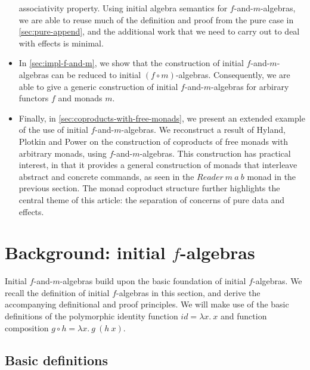 \documentclass{jfp1}
\begin{document}
\begin{itemize}
  associativity property. Using initial algebra semantics for
  $f$-and-$m$-algebras, we are able to reuse much of the
  definition and proof from the pure case in
  \autoref{sec:pure-append}, and the additional work that we need to
  carry out to deal with effects is minimal.
\item In \autoref{sec:impl-f-and-m}, we show that the construction of
  initial $f$-and-$m$-algebras can be reduced to initial $(f \circ
  m)$-algebras. Consequently, we are able to give a generic
  construction of initial $f$-and-$m$-algebras for arbirary functors
  $f$ and monads $m$.
\item Finally, in \autoref{sec:coproducts-with-free-monads}, we
  present an extended example of the use of initial
  $f$-and-$m$-algebras. We reconstruct a result of Hyland, Plotkin and
  Power on the construction of coproducts of free monads with
  arbitrary monads, using $f$-and-$m$-algebras. This construction has
  practical interest, in that it provides a general construction of
  monads that interleave abstract and concrete commands, as seen in
  the $\mathit{Reader}~m~a~b$ monad in the previous section. The monad
  coproduct structure further highlights the central theme of this
  article: the separation of concerns of pure data and effects.
\end{itemize}

\section{Background: initial \texorpdfstring{$f$}{f}-algebras}
\label{sec:f-algebras}

Initial $f$-and-$m$-algebras build upon the basic foundation of
initial $f$-algebras. We recall the definition of initial $f$-algebras
in this section, and derive the accompanying definitional and proof
principles. We will make use of the basic definitions of the
polymorphic identity function $\mathit{id} = \lambda x.~x$ and
function composition $g \circ h = \lambda x.~g~(h~x)$.

\subsection{Basic definitions}
\end{document}
